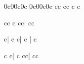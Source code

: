 \Startextract
\NOtes\qp\qp\en\Notes\ibl0c0\qb0c\qb0c\en
{}\changecontext
\NOtes\qp\en\Notes\ds\ds\en\Notes\ibl0c0\qb0c\qb0c\en\endextract
{}\Startextract
\NOtesp\pt c\qa c\en\Notes\ds\en\NOtes\qp\en
{}\changecontext
\NOtesp\pt c\qa c\en\NOtes\qp\en\Notes\ds\en\endextract
{}\Startextract
\NOTes{}\ha c\hpause\hpause\en
{}\changecontext
\NOTes\ha c\en\NOtes\qp\en\NOTes\hpause\en\NOtes\qp\en\endextract
\writeextract

\Startextract
\NOTesp\wrong\pt c\ha c\hpausep\en\endextract
{}\Startextract
\Notes\notrec\ca c\ds\ds\en\NOtes\qp\en\Notes\ds\en\NOtes\qp\en\Notes\ds\en
\NOtes\qp\en\Notes\ds\en\endextract
{}\Startextract
\NOTesp\right\pt c\ha c\en\NOtesp\qpp\qpp\en\bar
\NOTesp\right\pt c\ha c\en\NOtesp\qp\en\Notes\ds\en\NOtesp\qp\en\Notes\ds\en
\endextract
\writeextract

\Startextract
\Notes\right\ca c\ds\ds\en\NOtesp\qpp\en\NOTesp\hpausep\en\bar
\Notes\right\ca c\ds\ds\en\NOtes\qp\en\Notes\ds\en\NOTesp\hpausep\en\endextract
{}\Startextract
\Notes\wrong\ca c\ds\ds\en\NOtesp\qpp\qpp\qpp\qpp\en\bar
\Notes\notrec\ca c\ds\ds\en\Notesp\qp\en\Notes\ds\en
\Notesp\qp\en\Notes\ds\en\Notesp\qp\en\Notes\ds\en\Notesp\qp\en\Notes\ds\en\bar
\Notes\right\ca c\ds\ds\en\NOTes\hpausep\hpausep\en\endextract
\writeextract

\Startextract
\NOTesp\notrec\hpausep\en\NOTes\hpause\en\NOtes\qa c\en\endextract
{}\Startextract
\NOTes\right\hpause\en\NOtes\qp\en\NOTes\hpause\en\NOtes\qa c\en\bar
\NOTesp\right\hpausep\en\NOtes\qp\qp\qa c\en\endextract
{}\Startextract
\NOTesp\right\pt c\ha c\en\NOTes\hpause\en\NOtes\qp\en\bar
\NOTesp\right\pt c\ha c\hpausep\en\endextract
\writeextract


